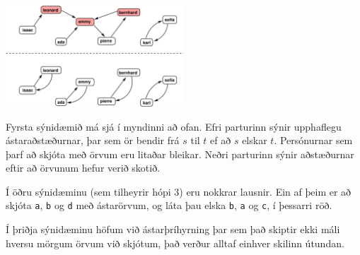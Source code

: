 \section*{\sampleexplanations}

\begin{center}
\includegraphics[width=0.5\textwidth]{polygonfig.pdf}
\end{center}


Fyrsta sýnidæmið má sjá í myndinni að ofan. Efri parturinn sýnir upphaflegu ástaraðstæðurnar, þar sem ör bendir frá $s$ til $t$ ef að $s$ elskar $t$. Persónurnar sem þarf að skjóta með örvum eru litaðar bleikar. Neðri parturinn sýnir aðstæðurnar eftir að örvunum hefur verið skotið.

Í öðru sýnidæminu (sem tilheyrir hópi 3) eru nokkrar lausnir.
Ein af þeim er að skjóta \texttt{a}, \texttt{b} og \texttt{d} með ástarörvum, og láta þau elska \texttt{b}, \texttt{a} og \texttt{c}, í þessarri röð.

Í þriðja sýnidæminu höfum við ástarþríhyrning þar sem það skiptir ekki máli hversu mörgum örvum við skjótum, það verður alltaf einhver skilinn útundan.
